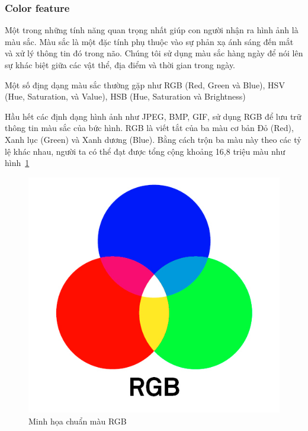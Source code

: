 \documentclass[a4paper,14pt]{extreport}
\begin{document}
\subsubsection*{Color feature}
Một trong những tính năng quan trọng nhất giúp con người nhận ra hình ảnh là màu sắc. Màu sắc là một đặc 
tính phụ thuộc vào sự phản xạ ánh sáng đến mắt và xử lý thông tin đó trong não. Chúng tôi sử dụng màu sắc hàng ngày để nói lên sự khác biệt giữa các vật thể, 
địa điểm và thời gian trong ngày.
\par
Một số địng dạng màu sắc thường gặp như RGB (Red, Green và Blue), HSV (Hue, Saturation, và Value), 
HSB (Hue, Saturation và Brightness)
\par 
Hầu hết các định dạng hình ảnh như JPEG, BMP, GIF, sử dụng RGB để lưu trữ thông tin màu sắc của bức hình.
RGB là viết tắt của ba màu cơ bản Đỏ (Red), Xanh lục (Green) và Xanh dương (Blue). 
Bằng cách trộn ba màu này theo các tỷ lệ khác nhau, người ta có thể đạt được tổng cộng khoảng 16,8 triệu màu như hình~\ref{fig:rgb} \cite{rgb}
\begin{figure}[h]
    \centering
    \includegraphics[scale=0.5]{img/RGB_1.png}
    \caption{Minh họa chuẩn màu RGB  \cite{rgb}}
    \label{fig:rgb}
\end{figure}
\end{document}
